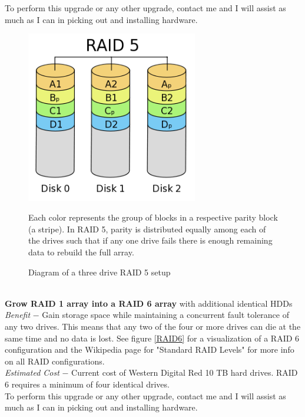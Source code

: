 \documentclass[titlepage]{article}
\begin{document}
    \noindent To perform this upgrade or any other upgrade, contact me and I will assist as much as I can in picking out and installing hardware.
    \\
    
    \begin{figure}[t]
    \centering
    \includegraphics[width=75mm]{RAID5.png}
     \caption{Diagram of a three drive RAID 5 setup}
     \medskip
     \small 
     Each color represents the group of blocks in a respective parity block (a stripe). In RAID 5, parity is distributed equally among each of the drives such that if any one drive fails there is enough remaining data to rebuild the full array.
     \label{RAID5}
    \end{figure}
    
    \noindent\makebox[\linewidth]{\rule{\textwidth}{0.4pt}}
    \\
    
    \noindent\textbf{Grow RAID 1 array into a RAID 6 array} with additional identical HDDs
    \\
    
    \noindent\textit{Benefit} $-$ Gain storage space while maintaining a concurrent fault tolerance of any two drives. This means that any two of the four or more drives can die at the same time and no data is lost. See figure \ref{RAID6} for a visualization of a RAID 6 configuration and the Wikipedia page for "Standard RAID Levels" for more info on all RAID configurations.
    \\
    
    \noindent\textit{Estimated Cost} $-$ Current cost of Western Digital Red 10 TB hard drives. RAID 6 requires a minimum of four identical drives.
    \\
    
    \noindent To perform this upgrade or any other upgrade, contact me and I will assist as much as I can in picking out and installing hardware.
    \\
    
\end{document}
